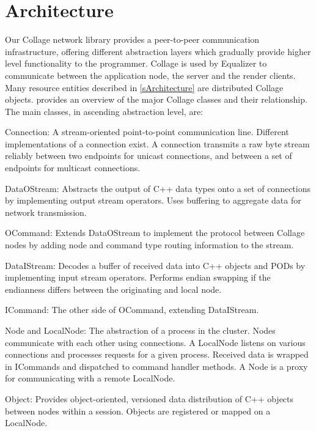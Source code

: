 \section{Architecture}

Our Collage network library provides a peer-to-peer communication
infrastructure, offering different abstraction layers which gradually provide
higher level functionality to the programmer. Collage is used by Equalizer to
communicate between the application node, the server and the render clients.
Many resource entities described in \cref{sArchitecture} are distributed
Collage objects.  provides an overview of the major Collage
classes and their relationship. The main classes, in ascending abstraction
level, are:

\begin{compactdesc}

\item[Connection:] A stream-oriented point-to-point communication line.
Different implementations of a connection exist. A connection transmits a raw
byte stream reliably between two endpoints for unicast connections, and between
a set of endpoints for multicast connections.

\item[DataOStream:] Abstracts the output of C++ data types onto a set of
  connections by implementing output stream operators. Uses buffering to
  aggregate data for network transmission.
\item[OCommand:] Extends DataOStream to implement the protocol between Collage
  nodes by adding node and command type routing information to the stream.
\item[DataIStream:] Decodes a buffer of received data into C++ objects and PODs
  by implementing input stream operators. Performs endian swapping if the
  endianness differs between the originating and local node.
\item[ICommand:] The other side of OCommand, extending DataIStream.
\item[Node and LocalNode:] The abstraction of a process in the cluster. Nodes
  communicate with each other using connections. A LocalNode listens on various
  connections and processes requests for a given process. Received data is
  wrapped in ICommands and dispatched to command handler methods. A Node is a
  proxy for communicating with a remote LocalNode.
\item[Object:] Provides object-oriented, versioned data distribution of C++
  objects between nodes within a session. Objects are registered or mapped on a
  Local\-Node.
\end{compactdesc}

